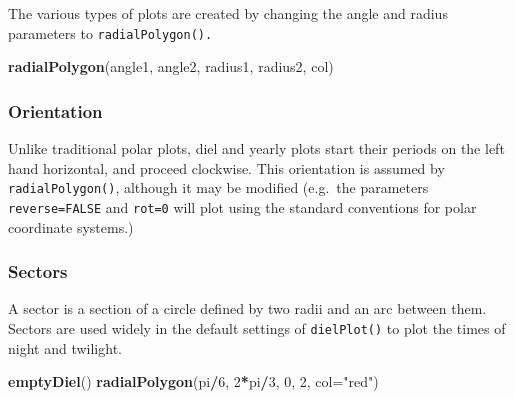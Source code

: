\documentclass[
]{book}
\newenvironment{Shaded}{\begin{snugshade}}{\end{snugshade}}
\newcommand{\AttributeTok}[1]{\textcolor[rgb]{0.13,0.29,0.53}{#1}}
\newcommand{\DecValTok}[1]{\textcolor[rgb]{0.00,0.00,0.81}{#1}}
\newcommand{\FunctionTok}[1]{\textcolor[rgb]{0.13,0.29,0.53}{\textbf{#1}}}
\newcommand{\NormalTok}[1]{#1}
\newcommand{\SpecialCharTok}[1]{\textcolor[rgb]{0.81,0.36,0.00}{\textbf{#1}}}
\newcommand{\StringTok}[1]{\textcolor[rgb]{0.31,0.60,0.02}{#1}}
\begin{document}
The various types of plots are created by changing the angle and radius parameters to \texttt{radialPolygon().}

\begin{Shaded}
\begin{Highlighting}[]
\FunctionTok{radialPolygon}\NormalTok{(angle1, angle2, radius1, radius2, col)}
\end{Highlighting}
\end{Shaded}

\hypertarget{orientation}{%
\subsubsection{Orientation}\label{orientation}}

Unlike traditional polar plots, diel and yearly plots start their periods on the left hand horizontal, and proceed clockwise. This orientation is assumed by \texttt{radialPolygon()}, although it may be modified (e.g.~the parameters \texttt{reverse=FALSE} and \texttt{rot=0} will plot using the standard conventions for polar coordinate systems.)

\hypertarget{sectors}{%
\subsubsection{Sectors}\label{sectors}}

A sector is a section of a circle defined by two radii and an arc between them. Sectors are used widely in the default settings of \texttt{dielPlot()} to plot the times of night and twilight.

\begin{Shaded}
\begin{Highlighting}[]
\FunctionTok{emptyDiel}\NormalTok{()}
\FunctionTok{radialPolygon}\NormalTok{(pi}\SpecialCharTok{/}\DecValTok{6}\NormalTok{, }\DecValTok{2}\SpecialCharTok{*}\NormalTok{pi}\SpecialCharTok{/}\DecValTok{3}\NormalTok{, }\DecValTok{0}\NormalTok{, }\DecValTok{2}\NormalTok{, }\AttributeTok{col=}\StringTok{"red"}\NormalTok{)}
\end{Highlighting}
\end{Shaded}
\end{document}
